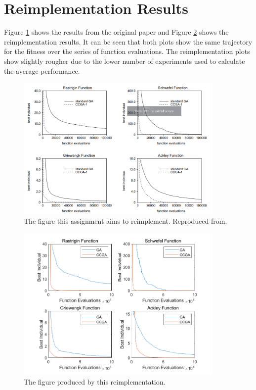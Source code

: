 \section{Reimplementation Results} \label{sec:reimplementation-results}

Figure \ref{fig:original_plot} shows the results from the original paper and Figure \ref{fig:combined_plot} shows the reimplementation results.
It can be seen that both plots show the same trajectory for the fitness over the series of function evaluations.
The reimplementation plots show slightly rougher due to the lower number of experiments used to calculate the average performance. 

\begin{figure}[ht!]
    \centering 
    \includegraphics[width=0.9\textwidth]{img/original_plot.png}
    \caption{The figure this assignment aims to reimplement. Reproduced from\cite{original-paper}.}
    \label{fig:original_plot}
  \end{figure}

  \begin{figure}[ht!]
    \centering 
    \includegraphics[width=0.9\textwidth]{img/combined_plot.png}
    \caption{The figure produced by this reimplementation.}
    \label{fig:combined_plot}
  \end{figure}
